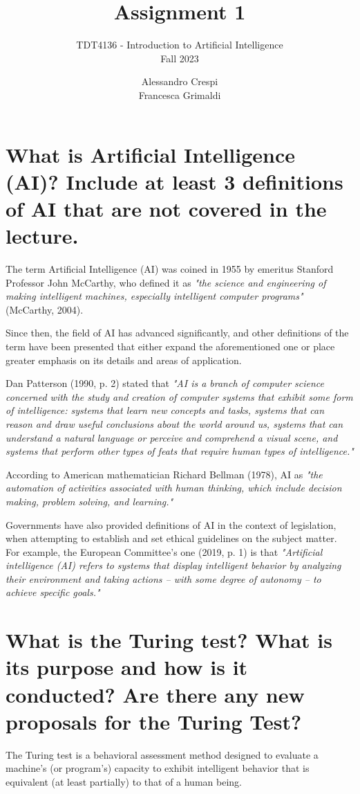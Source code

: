 \documentclass{article}
\title{%
    \huge Assignment 1}
\subtitle{%
    TDT4136 - Introduction to Artificial Intelligence \\
    Fall 2023
    }
\author{%
  Alessandro Crespi\\
  Francesca Grimaldi
}
\date{}
\begin{document}
\maketitle


\section{What is Artificial Intelligence (AI)? Include at least 3 definitions of AI that are not covered in the
lecture.}
The term Artificial Intelligence (AI) was coined in 1955 by emeritus Stanford Professor John McCarthy, who defined it as \emph{"the science and engineering of making intelligent machines, especially intelligent computer programs"} (McCarthy, 2004).

Since then, the field of AI has advanced significantly, and other definitions of the term have been presented that either expand the aforementioned one or place greater emphasis on its details and areas of application.

Dan Patterson (1990, p. 2) stated that \emph{"AI is a branch of computer science concerned with the study and creation of computer systems that exhibit some form of intelligence: systems that learn new concepts and tasks, systems that can reason and draw useful conclusions about the world around us, systems that can understand a natural language or perceive and comprehend a visual scene, and systems that perform other types of feats that require human types of intelligence."}

According to American mathematician Richard Bellman (1978), AI as \emph{"the automation of activities associated with human thinking, which include decision making, problem solving, and learning."}

Governments have also provided definitions of AI in the context of legislation, when attempting to establish and set ethical guidelines on the subject matter.
For example, the European Committee's one (2019, p. 1) is that \emph{"Artificial intelligence (AI) refers to systems that display intelligent behavior by analyzing their environment and taking actions – with some degree of autonomy – to achieve specific goals."}


\section{What is the Turing test? What is its purpose and how is it conducted? Are there any new proposals
for the Turing Test?}
The Turing test is a behavioral assessment method designed to evaluate a machine's (or program's) capacity to exhibit intelligent behavior that is equivalent (at least partially) to that of a human being. 
\end{document}

